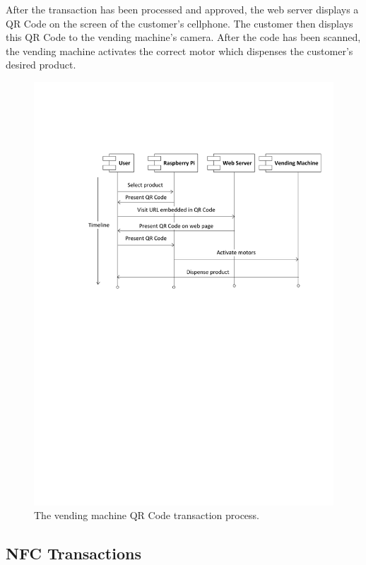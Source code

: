 After the transaction has been processed and approved, the web server displays a
QR Code on the screen of the customer's cellphone. The customer then displays
this QR Code to the vending machine's camera. After the code has been
scanned, the vending machine activates the correct motor which dispenses the
customer's desired product.

\begin{figure}
 \centering 
 \includegraphics[clip=true, trim = 0 400 0 140, scale=0.7]{qrcode_processflow_user}
 \caption{The vending machine QR Code transaction process.}
 \label{fig:vm_prog_interaction}
\end{figure}

\subsection{NFC Transactions}

